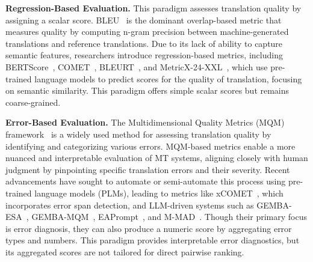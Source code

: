 \documentclass{article}
\theoremstyle{plain}
\theoremstyle{definition}
\theoremstyle{remark}
\begin{document}
\noindent
\textbf{Regression-Based Evaluation.}
This paradigm assesses translation quality by assigning a scalar score. BLEU~\citep{Papineni2002BleuAM} is the dominant overlap-based metric that measures quality by computing n-gram precision between machine-generated translations and reference translations. Due to its lack of ability to capture semantic features, researchers introduce regression-based metrics, including BERTScore~\citep{Zhang2019BERTScoreET}, COMET~\citep{Rei2020COMETAN}, BLEURT~\citep{Sellam2020BLEURTLR}, and MetricX-24-XXL~\citep{juraska-etal-2024-metricx}, which use pre-trained language models to predict scores for the quality of translation, focusing on semantic similarity. This paradigm offers simple scalar scores but remains coarse-grained.

\noindent
\textbf{Error-Based Evaluation.}
The Multidimensional Quality Metrics (MQM) framework~\citep{Lommel2013MultidimensionalQM} is a widely used method for assessing translation quality by identifying and categorizing various errors. MQM-based metrics enable a more nuanced and interpretable evaluation of MT systems, aligning closely with human judgment by pinpointing specific translation errors and their severity. 
Recent advancements have sought to automate or semi-automate this process using pre-trained language models (PLMs), leading to metrics like xCOMET~\citep{Guerreiro2023xcometTM}, which incorporates error span detection, and LLM-driven systems such as GEMBA-ESA~\citep{kocmi-federmann-2023-large}, GEMBA-MQM~\citep{GEMBA}, EAPrompt~\citep{ErrorAna}, and M-MAD~\citep{M-MAD}. Though their primary focus is error diagnosis, they can also produce a numeric score by aggregating error types and numbers. This paradigm provides interpretable error diagnostics, but its aggregated scores are not tailored for direct pairwise ranking.
\end{document}
